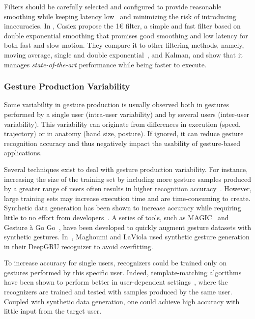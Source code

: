 Filters should be carefully selected and configured to provide reasonable smoothing while keeping latency low~\cite{Pavlovych:2009} and minimizing the risk of introducing inaccuracies. In \cite{Casiez:2012}, Casiez \etal propose the 1€ filter, a simple and fast filter based on double exponential smoothing that promises good smoothing and low latency for both fast and slow motion. They compare it to other filtering methods, namely, moving average, single and double exponential~\cite{LaViola:2003}, and Kalman, and show that it manages \textit{state-of-the-art} performance while being faster to execute.


\subsubsection{Gesture Production Variability} \label{sec:state_of_the_art:overview:challenges:production-variability}
Some variability in gesture production is usually observed both in gestures performed by a single user (intra-user variability) and by several users (inter-user variability). This variability can originate from differences in execution (\eg speed, trajectory) or in anatomy (\eg hand size, posture). If ignored, it can reduce gesture recognition accuracy and thus negatively impact the usability of gesture-based applications.

Several techniques exist to deal with gesture production variability. For instance, increasing the size of the training set by including more gesture samples produced by a greater range of users often results in higher recognition accuracy~\cite{Vatavu:2013}.
However, large training sets may increase execution time and are time-consuming to create. Synthetic data generation has been shown to increase accuracy while requiring little to no effort from developers~\cite{Taranta:2016, Leiva:2015}. A series of tools, such as MAGIC~\cite{Ashbrook:2010, Kohlsdorf:2011, Kohlsdorf:2013} and Gesture à Go Go~\cite{Leiva:2015}, have been developed to quickly augment gesture datasets with synthetic gestures. In~\cite{Maghoumi:2019}, Maghoumi and LaViola used synthetic gesture generation in their DeepGRU recognizer to avoid overfitting.

To increase accuracy for single users, recognizers could be trained only on gestures performed by this specific user. Indeed, template-matching algorithms have been shown to perform better in user-dependent settings~\cite{Vatavu:2013}, \ie where the recognizers are trained and tested with samples produced by the same user. 
Coupled with synthetic data generation, one could achieve high accuracy with little input from the target user. 

